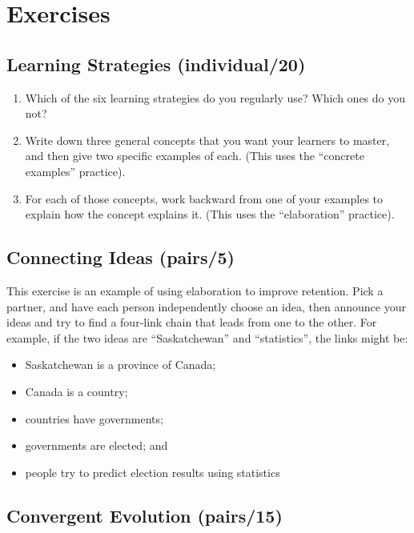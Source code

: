 \section{Exercises}\label{s:individual-exercises}

\subsection*{Learning Strategies (individual/20)}

\begin{enumerate}
\item
  Which of the six learning strategies do you regularly use? Which
  ones do you not?
\item
  Write down three general concepts that you want your learners to
  master, and then give two specific examples of each. (This uses the
  ``concrete examples'' practice).
\item
  For each of those concepts, work backward from one of your examples
  to explain how the concept explains it. (This uses the ``elaboration''
  practice).
\end{enumerate}

\subsection*{Connecting Ideas (pairs/5)}

This exercise is an example of using elaboration to improve
retention. Pick a partner, and have each person independently choose an
idea, then announce your ideas and try to find a four-link chain that
leads from one to the other. For example, if the two ideas are
``Saskatchewan'' and ``statistics'', the links might be:

\begin{itemize}
\item
  Saskatchewan is a province of Canada;
\item
  Canada is a country;
\item
  countries have governments;
\item
  governments are elected; and
\item
  people try to predict election results using statistics
\end{itemize}

\subsection*{Convergent Evolution (pairs/15)}

